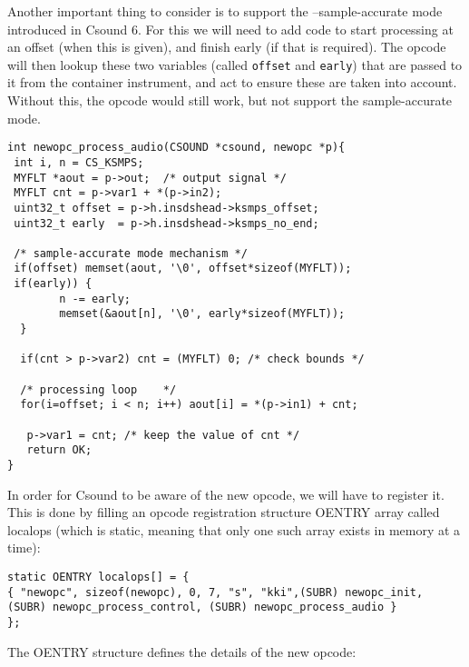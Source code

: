 \documentclass[11pt]{article}
\begin{document}
Another important thing to consider is to support the --sample-accurate mode introduced in Csound 6. For this we will need to add code to start processing at an offset (when this is given), and finish early (if that is required). The opcode will then lookup these two variables (called {\tt offset} and {\tt early}) that are passed to it from the container instrument, and act to ensure these are taken into account. Without this, the opcode would still work, but not support the sample-accurate mode.

\begin{lstlisting}
int newopc_process_audio(CSOUND *csound, newopc *p){
 int i, n = CS_KSMPS;
 MYFLT *aout = p->out;  /* output signal */
 MYFLT cnt = p->var1 + *(p->in2);
 uint32_t offset = p->h.insdshead->ksmps_offset;
 uint32_t early  = p->h.insdshead->ksmps_no_end;

 /* sample-accurate mode mechanism */
 if(offset) memset(aout, '\0', offset*sizeof(MYFLT));
 if(early)) {
        n -= early;
        memset(&aout[n], '\0', early*sizeof(MYFLT));
  }         

  if(cnt > p->var2) cnt = (MYFLT) 0; /* check bounds */
	
  /* processing loop    */
  for(i=offset; i < n; i++) aout[i] = *(p->in1) + cnt;
	
   p->var1 = cnt; /* keep the value of cnt */
   return OK;
}
\end{lstlisting}


In order for Csound to be aware of the new opcode, we will have to register it. This is done by filling an opcode registration structure OENTRY array called localops (which is static, meaning that only one such array exists in memory at a time):

\begin{lstlisting}
static OENTRY localops[] = {
{ "newopc", sizeof(newopc), 0, 7, "s", "kki",(SUBR) newopc_init, 
(SUBR) newopc_process_control, (SUBR) newopc_process_audio }
};
\end{lstlisting}

The OENTRY structure defines the details of the new opcode:
\end{document}
